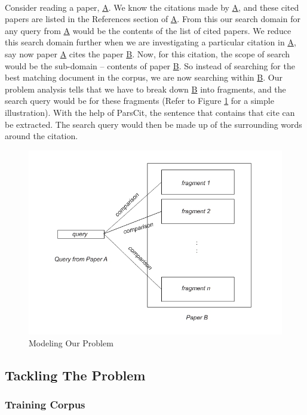 \documentclass[12 pt]{article}
\begin{document}
\paragraph{}
Consider reading a paper, \url{A}. We know the citations made by \url{A}, and these cited papers are listed in the References section of \url{A}. From this our search domain for any query from \url{A} would be the contents of the list of cited papers. We reduce this search domain further when we are investigating a particular citation in \url{A}, say now paper \url{A} cites the paper \url{B}. Now, for this citation, the scope of search would be the sub-domain -- contents of paper \url{B}. So instead of searching for the best matching document in the corpus, we are now searching within \url{B}. Our problem analysis tells that we have to break down \url{B} into fragments, and the search query would be for these fragments (Refer to Figure \ref{fig:model} for a simple illustration). With the help of ParsCit\cite{parscit}, the sentence that contains that cite can be extracted. The search query would then be made up of the surrounding words around the citation.

\begin{figure}[h]
  \centering
  \includegraphics[scale=0.75]{./model}
  \caption{Modeling Our Problem}
  \label{fig:model}
\end{figure}

\subsection{Tackling The Problem}
\subsubsection{Training Corpus}
\end{document}

